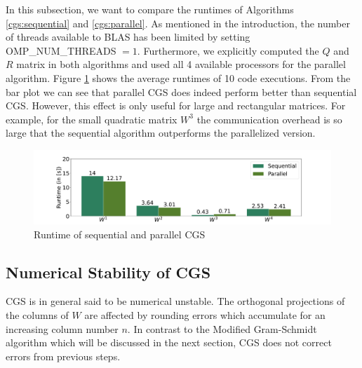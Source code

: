 \documentclass{article}
\begin{document}
In this subsection, we want to compare the runtimes of Algorithms
\ref{cgs:sequential} and \ref{cgs:parallel}. As mentioned in the introduction,
the number of threads available to BLAS has been limited by setting
OMP\_NUM\_THREADS $= 1$. Furthermore, we explicitly computed the $Q$ and $R$
matrix in both algorithms and used all 4 available processors for the parallel
algorithm. Figure \ref{fig:performanceCGS} shows the average runtimes of 10 code
executions. From the bar plot we can see that parallel CGS does indeed perform
better than sequential CGS. However, this effect is only useful for large and
rectangular matrices. For example, for the small quadratic matrix $W^3$ the
communication overhead is so large that the sequential algorithm outperforms the
parallelized version.

\begin{figure}[t]
    \caption{Runtime of sequential and parallel CGS} \label{fig:performanceCGS}
    \centering
    \includegraphics[width=\textwidth, trim = 0cm 1.5cm 0cm 1cm]{./plots/CGS_Performance.pdf}
\end{figure}

\subsection{Numerical Stability of CGS} \label{section:cgsStability}

CGS is in general said to be numerical unstable. The orthogonal projections of
the columns of $W$ are affected by rounding errors which accumulate for an
increasing column number $n$. In contrast to the Modified Gram-Schmidt algorithm
which will be discussed in the next section, CGS does not correct errors from
previous steps.
\end{document}
